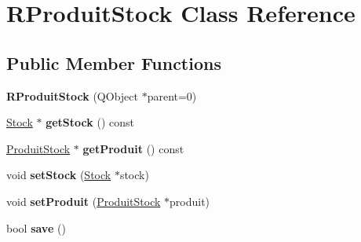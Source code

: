 \hypertarget{class_r_produit_stock}{
\section{RProduitStock Class Reference}
\label{class_r_produit_stock}
}
\subsection*{Public Member Functions}
\begin{DoxyCompactItemize}
\item 
\hypertarget{class_r_produit_stock_a1df8141fd615ef92ef339aaa5aaebda2}{
{\bfseries RProduitStock} (QObject $\ast$parent=0)}
\label{class_r_produit_stock_a1df8141fd615ef92ef339aaa5aaebda2}

\item 
\hypertarget{class_r_produit_stock_aeac07ea2f11a5a160541a0988c5f415e}{
\hyperlink{class_stock}{Stock} $\ast$ {\bfseries getStock} () const }
\label{class_r_produit_stock_aeac07ea2f11a5a160541a0988c5f415e}

\item 
\hypertarget{class_r_produit_stock_a0e5fb6e3c1d471d83bef0a5355f777f7}{
\hyperlink{class_produit_stock}{ProduitStock} $\ast$ {\bfseries getProduit} () const }
\label{class_r_produit_stock_a0e5fb6e3c1d471d83bef0a5355f777f7}

\item 
\hypertarget{class_r_produit_stock_a1bba3f9155e004aa1b59c7cc39f2ff22}{
void {\bfseries setStock} (\hyperlink{class_stock}{Stock} $\ast$stock)}
\label{class_r_produit_stock_a1bba3f9155e004aa1b59c7cc39f2ff22}

\item 
\hypertarget{class_r_produit_stock_a24cc1901f0ff507f4edb67eedc0639ff}{
void {\bfseries setProduit} (\hyperlink{class_produit_stock}{ProduitStock} $\ast$produit)}
\label{class_r_produit_stock_a24cc1901f0ff507f4edb67eedc0639ff}

\item 
\hypertarget{class_r_produit_stock_a44f49bedc1bfa329a540f25bc2baf1d1}{
bool {\bfseries save} ()}
\label{class_r_produit_stock_a44f49bedc1bfa329a540f25bc2baf1d1}

\end{DoxyCompactItemize}
